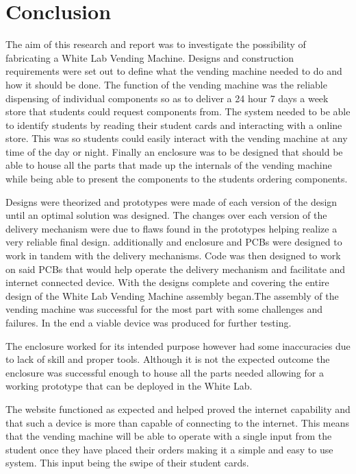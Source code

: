 \documentclass[a4paper,11pt]{article}
\numberwithin{figure}{section}
\numberwithin{table}{section}
\begin{document}
\section{Conclusion}\thispagestyle{sectionstart}
The aim of this research and report was to investigate the possibility of fabricating a White Lab Vending Machine. Designs and construction requirements were set out to define what the vending machine needed to do and how it should be done. The function of the vending machine was the reliable dispensing of individual components so as to deliver a 24 hour 7 days a week store that students could request components from. The system needed to be able to identify students by reading their student cards and interacting with a online store. This was so students could easily interact with the vending machine at any time of the day or night. Finally an enclosure was to be designed that should be able to house all the parts that made up the internals of the vending machine while being able to present the components to the students ordering components.

Designs were theorized and prototypes were made of each version of the design until an optimal solution was designed. The changes over each version of the delivery mechanism were due to flaws found in the prototypes helping realize a very reliable final design. additionally and enclosure and PCBs were designed to work in tandem with the delivery mechanisms. Code was then designed to work on said PCBs that would help operate the delivery mechanism and facilitate and internet connected device. With the designs complete and covering the entire design of the White Lab Vending Machine assembly began.The assembly of the vending machine was successful for the most part with some challenges and failures. In the end a viable device was produced for further testing. 

The enclosure worked for its intended purpose however had some inaccuracies due to lack of skill and proper tools. Although it is not the expected outcome the enclosure was successful enough to house all the parts needed allowing for a working prototype that can be deployed in the White Lab.

The website functioned as expected and helped proved the internet capability and that such a device is more than capable of connecting to the internet. This means that the vending machine will be able to operate with a single input from the student once they have placed their orders making it a simple and easy to use system. This input being the swipe of their student cards. 
\end{document}
